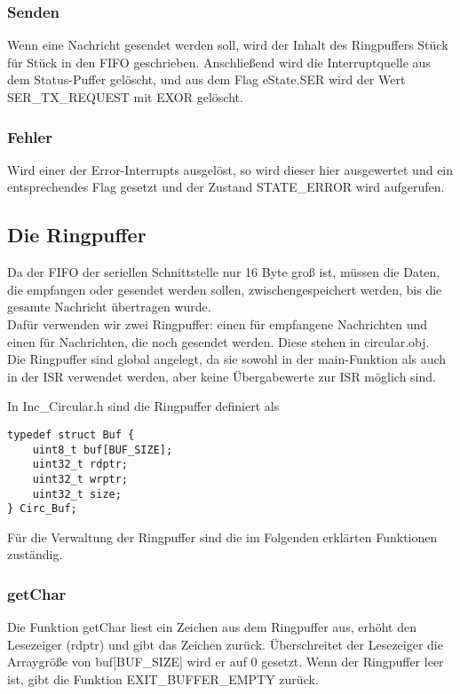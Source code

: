 \documentclass{scrartcl}
\begin{document}
\subsubsection{Senden}
Wenn eine Nachricht gesendet werden soll, wird der Inhalt des Ringpuffers Stück für Stück in den FIFO geschrieben. Anschließend wird die Interruptquelle aus dem Status-Puffer gelöscht, und aus dem Flag eState.SER wird der Wert SER\_TX\_REQUEST mit EXOR gelöscht.

\subsubsection{Fehler}
Wird einer der Error-Interrupts ausgelöst, so wird dieser hier ausgewertet und ein entsprechendes Flag gesetzt und der Zustand STATE\_ERROR wird aufgerufen.



\subsection{Die Ringpuffer}
Da der FIFO der seriellen Schnittstelle nur 16 Byte groß ist, müssen die Daten, die empfangen oder gesendet werden sollen, zwischengespeichert werden, bis die gesamte Nachricht übertragen wurde.\\
Dafür verwenden wir zwei Ringpuffer: einen für empfangene Nachrichten und einen für Nachrichten, die noch gesendet werden. Diese stehen in circular.obj.\\
Die Ringpuffer sind global angelegt, da sie sowohl in der main-Funktion als auch in der ISR verwendet werden, aber keine Übergabewerte zur ISR möglich sind.

In Inc\_Circular.h sind die Ringpuffer definiert als



\begin{verbatim}
typedef struct Buf {
	uint8_t buf[BUF_SIZE];
	uint32_t rdptr;
	uint32_t wrptr;
	uint32_t size;
} Circ_Buf;
\end{verbatim}

Für die Verwaltung der Ringpuffer sind die im Folgenden erklärten Funktionen zuständig.

\subsubsection{getChar}
Die Funktion getChar liest ein Zeichen aus dem Ringpuffer aus, erhöht den Lesezeiger (rdptr) und gibt das Zeichen zurück. Überschreitet der Lesezeiger die Arraygröße von buf[BUF\_SIZE] wird er auf 0 gesetzt. Wenn der Ringpuffer leer ist, gibt die Funktion EXIT\_BUFFER\_EMPTY zurück.
\end{document}
